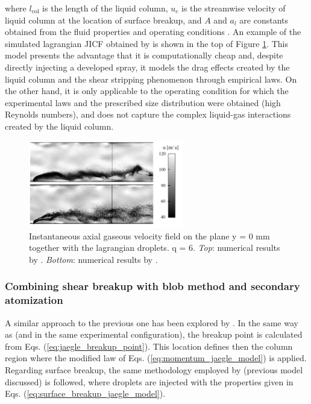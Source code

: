 where $l_\mathrm{col}$ is the length of the liquid column, $u_c$ is the streamwise velocity of liquid column at the location of surface breakup, and $A$ and $a_l$ are constants obtained from the fluid properties and operating conditions . An example of the simulated lagrangian JICF obtained by  is shown in the top of Figure \ref{fig:jaegle_senoner_lagrangian_fields}. This model presents the advantage that it is computationally cheap and, despite directly injecting a developed spray, it models the drag effects created by the liquid column and the shear stripping phenomenon through empirical laws. On the other hand, it is only applicable to the operating condition for which the experimental laws and the prescribed size distribution were obtained (high Reynolds numbers), and does not capture the complex liquid-gas interactions created by the liquid column.

\begin{figure}[ht]
    \centering
    \includegraphics[width=0.6\textwidth]{./part1_numerical_approaches/figures_ch3/jaegle_senoner_lagrangian_fields}
       \centering
    \caption[Instantaneous axial gaseous velocity field on the plane y = 0 mm together with the lagrangian
droplets.]{Instantaneous axial gaseous velocity field on the plane y = 0 mm together with the lagrangian
droplets. q = 6. \textsl{Top}: numerical results by . \textsl{Bottom}: numerical results by .}
    \label{fig:jaegle_senoner_lagrangian_fields}
\end{figure}

\subsubsection*{Combining shear breakup with blob method and secondary atomization }

A similar approach to the previous one has been explored by . In the same way as  (and in the same experimental configuration), the breakup point is calculated from Eqs. (\ref{eq:jaegle_breakup_point}). This location defines then the column region where the modified law of Eqs. (\ref{eq:momentum_jaegle_model}) is applied. Regarding surface breakup, the same methodology employed by  (previous model discussed) is followed, where droplets are injected with the properties given in Eqs. (\ref{eq:surface_breakup_jaegle_model}).

